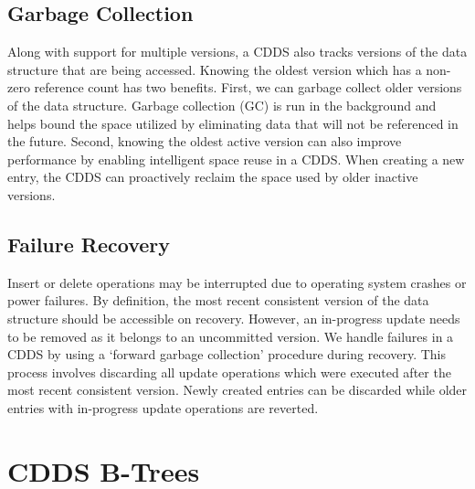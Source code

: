 \subsection{Garbage Collection}

Along with support for multiple versions, a CDDS also tracks versions
of the data structure that are being accessed.  Knowing the oldest
version which has a non-zero reference count has two benefits.  First,
we can garbage collect older versions of the data structure. Garbage
collection (GC) is run in the background and helps bound the space
utilized by eliminating data that will not be referenced in the
future.  Second, knowing the oldest active version can also improve
performance by enabling intelligent space reuse in a CDDS\@. When
creating a new entry, the CDDS can proactively reclaim the space used
by older inactive versions.



\subsection{Failure Recovery}

Insert or delete operations may be interrupted due to operating system
crashes or power failures.  By definition, the most recent consistent
version of the data structure should be accessible on recovery.
However, an in-progress update needs to be removed as it belongs to an
uncommitted version.  We handle failures in a CDDS by using a `forward
garbage collection' procedure during recovery.  This process involves
discarding all update operations which were executed after the most
recent consistent version.  Newly created entries can be discarded while
older entries with in-progress update operations are reverted.




\section{CDDS B-Trees}
\label{sec:cdds_btree}


